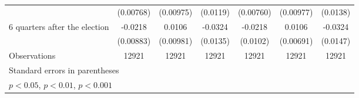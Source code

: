 \begin{table}[!ht]
\begin{tabular}{l*{6}{c}}
                    &   (0.00768)         &   (0.00975)         &    (0.0119)         &   (0.00760)         &   (0.00977)         &    (0.0138)         \\
[1em]
 6 quarters after the election&     -0.0218\sym{*}  &      0.0106         &     -0.0324\sym{*}  &     -0.0218\sym{*}  &      0.0106         &     -0.0324\sym{*}  \\
                    &   (0.00883)         &   (0.00981)         &    (0.0135)         &    (0.0102)         &   (0.00691)         &    (0.0147)         \\
\hline
Observations        &       12921         &       12921         &       12921         &       12921         &       12921         &       12921         \\
\hline\hline
\multicolumn{7}{l}{\footnotesize Standard errors in parentheses}\\
\multicolumn{7}{l}{\footnotesize \sym{*} \(p<0.05\), \sym{**} \(p<0.01\), \sym{***} \(p<0.001\)}\\
\end{tabular}
\end{table}
